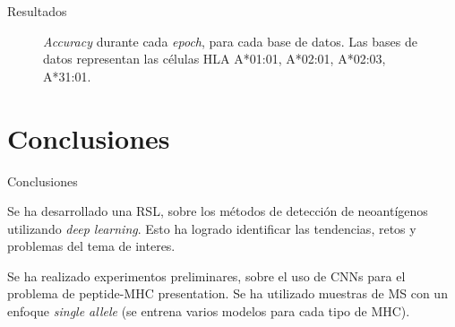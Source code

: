 \documentclass[10pt]{beamer}
\newcommand{\1}{
	\setbeamertemplate{background}{
		\texttt{[image: img/1]}
		\tikz[overlay] \fill[fill opacity=0.75,fill=white] (0,0) rectangle (-\paperwidth,\paperheight);
	}
}
\begin{document}
\begin{frame}{Resultados}{}
	\begin{figure}[H]
		\centering
		
		\caption{\textit{Accuracy} durante cada \textit{epoch}, para cada base de datos. Las bases de datos representan las células HLA A*01:01, A*02:01, A*02:03, A*31:01.}
		\label{fig:result}
	\end{figure}
\end{frame}




\section{Conclusiones}


\begin{frame}{Conclusiones}{}
	
	\begin{block}{}
		Se ha desarrollado una RSL, sobre los métodos de detección de neoantígenos utilizando \textit{deep learning}. Esto ha logrado identificar las tendencias, retos y problemas del tema de interes.
	\end{block}

	\begin{block}{}
		Se ha realizado experimentos preliminares, sobre el uso de CNNs para el problema de peptide-MHC presentation. Se ha utilizado muestras de MS con un enfoque \textit{single allele} (se entrena varios modelos para cada tipo de MHC). 
	\end{block}

\end{frame}
\end{document}
